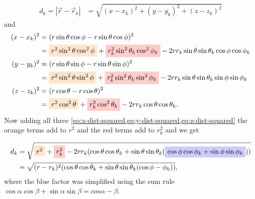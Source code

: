 \begin{align}
    d_k = \left|\vec{r} - \vec{r}_k \right| &= \sqrt{(x-x_k)^2 + (y-y_k)^2 + (z-z_k)^2}
\end{align}
and
\begin{align}
    (x-x_k)^2 &= (r\sin{\theta}\cos{\phi} - r\sin{\theta}\cos{\phi})^2 \nonumber \\
    &= \tikz[baseline]{
        \node[fill=orange!20,anchor=base]
        {\(r^2\sin^2{\theta}\cos^2{\phi}\)}
    } + \tikz[baseline]{
        \node[fill=red!20,anchor=base]
        {\(r_k^2\sin^2{\theta_k}\cos^2{\phi_k}\)}
    } - 2r r_k \sin{\theta}\sin{\theta_k}\cos{\phi}\cos{\phi_k} \label{eq:x-dist-squared} \\
    (y-y_k)^2 &= (r\sin{\theta}\sin{\phi} - r\sin{\theta}\sin{\phi})^2 \nonumber \\
    &= \tikz[baseline]{
        \node[fill=orange!20,anchor=base]
        {\(r^2\sin^2{\theta}\sin^2{\phi}\)}
    } + \tikz[baseline]{
        \node[fill=red!20,anchor=base]
        {\(r_k^2\sin^2{\theta_k}\sin^2{\phi_k}\)}
    } - 2r r_k \sin{\theta}\sin{\theta_k}\sin{\phi}\sin{\phi_k} \label{eq:y-dist-squared} \\
    (z-z_k)^2 &= (r\cos{\theta} - r\cos{\theta})^2 \nonumber \\
    &= \tikz[baseline]{
        \node[fill=orange!20,anchor=base]
        {\(r^2\cos^2{\theta}\)}
    } + \tikz[baseline]{
        \node[fill=red!20,anchor=base]
        {\(r_k^2\cos^2{\theta_k}\)}
    } - 2r r_k \cos{\theta}\cos{\theta_k}. \label{eq:z-dist-squared}
\end{align}
Now adding all three \cref{eq:x-dist-squared,eq:y-dist-squared,eq:z-dist-squared} the orange terms add to \(r^2\) and the red terms add to \(r_k^2\) and we get

\begin{align}
    d_k &= \sqrt{
        \tikz[baseline]{\node[fill=orange!20,anchor=base]{\(r^2\)}}
        + \tikz[baseline]{\node[fill=red!20,anchor=base]{\(r_k^2\)}}
        -2r r_k(\cos{\theta}\cos{\theta_k}+\sin{\theta}\sin{\theta_k}(
            \tikz[baseline]{\node[fill=blue!20,anchor=base]{
                \(\cos{\phi}\cos{\phi_k} + \sin{\phi}\sin{\phi_k}\)}}
        ))
    } \\
    &= \sqrt{(r - r_k)^2(\cos{\theta}\cos{\theta_k}+\sin{\theta}\sin{\theta_k}(\cos{\phi - \phi_k}))},
\end{align}
where the blue factor was simplified using the sum rule \\
\(\cos{\alpha}\cos{\beta} + \sin{\alpha}\sin{\beta} = cos{\alpha-\beta}\)\cite{WeissteinTrig}.

